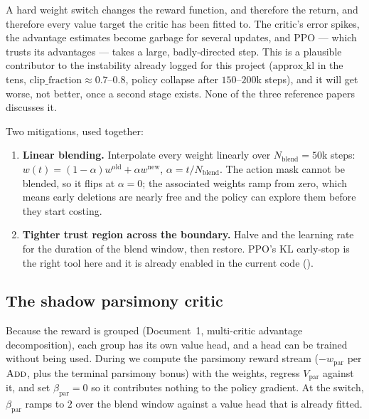 \documentclass[11pt,a4paper]{article}
\begin{document}
A hard weight switch changes the reward function, and therefore the return, and therefore
every value target the critic has been fitted to. The critic's error spikes, the advantage
estimates become garbage for several updates, and PPO --- which trusts its advantages ---
takes a large, badly-directed step. This is a plausible contributor to the instability
already logged for this project ($\text{approx\_kl}$ in the tens, $\text{clip\_fraction}
\approx 0.7$--$0.8$, policy collapse after $150$--$200$k steps), and it will get worse, not
better, once a second stage exists. None of the three reference papers discusses it.

Two mitigations, used together:

\begin{enumerate}[label=(\roman*)]
  \item \textbf{Linear blending.} Interpolate every weight linearly over
        $N_{\mathrm{blend}} = 50$k steps:
        $w(t) = (1-\alpha)w^{\mathrm{old}} + \alpha w^{\mathrm{new}}$, $\alpha = t/N_{\mathrm{blend}}$.
        The action mask cannot be blended, so it flips at $\alpha = 0$; the associated
        weights ramp from zero, which means early deletions are nearly free and the policy
        can explore them before they start costing.
  \item \textbf{Tighter trust region across the boundary.} Halve  and the
        learning rate for the duration of the blend window, then restore. PPO's KL early-stop
        \cite{schulman2017ppo} is the right tool here and it is already enabled in the current
        code ().
\end{enumerate}

\subsection{The shadow parsimony critic}\label{sec:shadow}

Because the reward is grouped (Document~1, multi-critic advantage decomposition), each group has its own
value head, and a head can be trained without being used. During \stageI{} we compute the
parsimony reward stream ($-w_{\mathrm{par}}$ per $\textsc{Add}$, plus the terminal parsimony bonus)
with the \emph{\stageII{}} weights, regress $V_{\mathrm{par}}$ against it, and set
$\beta_{\mathrm{par}} = 0$ so it contributes nothing to the policy gradient. At the switch,
$\beta_{\mathrm{par}}$ ramps to $2$ over the blend window against a value head that is already
fitted.
\end{document}
